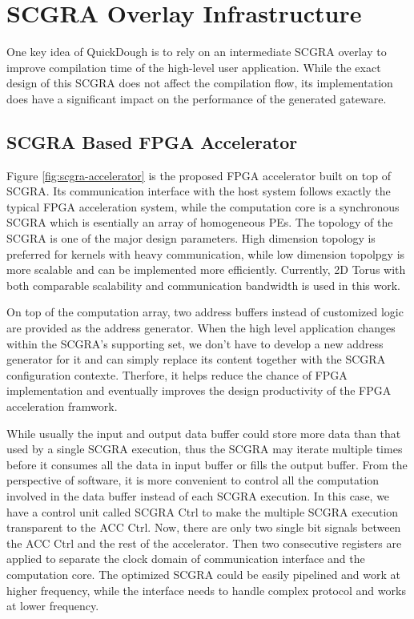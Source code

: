 \section{SCGRA Overlay Infrastructure} \label{sec:scgraimplement}
One key idea of QuickDough is to rely on an intermediate SCGRA overlay to improve compilation time of the high-level user application. While the exact design of this SCGRA does not affect the compilation flow, its implementation does have a significant impact on the performance of the generated gateware.
 
\subsection{SCGRA Based FPGA Accelerator}
Figure \ref{fig:scgra-accelerator} is the proposed FPGA accelerator built on top of SCGRA. Its communication interface with the host system follows exactly the typical FPGA acceleration system, while the computation core is a synchronous SCGRA which is esentially an array of homogeneous PEs. The topology of the SCGRA is one of the major design parameters. High dimension topology is preferred for kernels with heavy communication, while low dimension topolpgy is more scalable and can be implemented more efficiently. Currently, 2D Torus with both comparable scalability and communication bandwidth is used in this work. 

On top of the computation array, two address buffers instead of customized logic are provided as the address generator. When the high level application changes within the SCGRA's supporting set, we don't have to develop a new address generator for it and can simply replace its content together with the SCGRA configuration contexte. Therfore, it helps reduce the chance of FPGA implementation and eventually improves the design productivity of the FPGA acceleration framwork. 

While usually the input and output data buffer could store more data than that used by a single SCGRA execution, thus the SCGRA may iterate multiple times before it consumes all the data in input buffer or fills the output buffer. From the perspective of software, it is more convenient to control all the computation involved in the data buffer instead of each SCGRA execution. In this case, we have a control unit called SCGRA Ctrl to make the multiple SCGRA execution transparent to the ACC Ctrl. Now, there are only two single bit signals between the ACC Ctrl and the rest of the accelerator. Then two consecutive registers are applied to separate the clock domain of communication interface and the computation core. The optimized SCGRA could be easily pipelined and work at higher frequency, while the interface needs to handle complex protocol and works at lower frequency.

